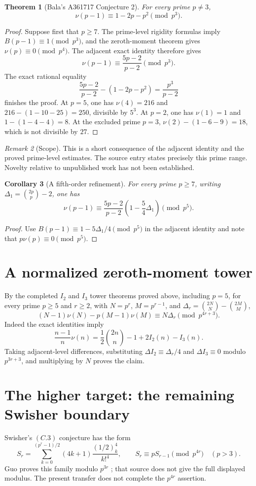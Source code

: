 \documentclass[11pt]{amsart}
\newtheorem{theorem}{Theorem}[section]
\newtheorem{corollary}[theorem]{Corollary}
\theoremstyle{definition}
\theoremstyle{remark}
\newtheorem{remark}[theorem]{Remark}
\begin{document}
\begin{theorem}[Bala's A361717 Conjecture 2]
For every prime $p\ne3$,
\[
 \nu(p-1)\equiv1-2p-p^2\pmod{p^3}.
\]
\end{theorem}
\begin{proof}
Suppose first that $p\geq7$. The prime-level rigidity formulas imply
$B(p-1)\equiv1\pmod{p^3}$, and the zeroth-moment theorem gives
$\nu(p)\equiv0\pmod{p^4}$. The adjacent exact identity therefore gives
\[
 \nu(p-1)\equiv\frac{5p-2}{p-2}\pmod{p^3}.
\]
The exact rational equality
\[
 \frac{5p-2}{p-2}-(1-2p-p^2)=\frac{p^3}{p-2}
\]
finishes the proof. At $p=5$, one has $\nu(4)=216$ and
$216-(1-10-25)=250$, divisible by $5^3$. At $p=2$, one has
$\nu(1)=1$ and $1-(1-4-4)=8$. At the excluded prime $p=3$,
$\nu(2)-(1-6-9)=18$, which is not divisible by $27$.
\end{proof}

\begin{remark}[Scope]
This is a short consequence of the adjacent identity and the proved
prime-level estimates. The source entry states precisely this prime range.
Novelty relative to unpublished work has not been established.
\end{remark}

\begin{corollary}[A fifth-order refinement]
For every prime $p\geq7$, writing
$\Delta_1=\binom{2p}{p}-2$, one has
\[
 \nu(p-1)\equiv\frac{5p-2}{p-2}
       \left(1-\frac54\Delta_1\right)\pmod{p^5}.
\]
\end{corollary}
\begin{proof}
Use $B(p-1)\equiv1-5\Delta_1/4\pmod{p^5}$ in the adjacent
identity and note that $p\nu(p)\equiv0\pmod{p^5}$.
\end{proof}

\section{A normalized zeroth-moment tower}
By the completed $I_2$ and $I_3$ tower theorems proved above, including $p=5$, for every prime $p\geq5$ and $r\geq2$, with
$N=p^r$, $M=p^{r-1}$, and
$\Delta_r=\binom{2N}{N}-\binom{2M}{M}$,
\[
 (N-1)\nu(N)-p(M-1)\nu(M)
       \equiv N\Delta_r\pmod{p^{4r+3}}.
\]
Indeed the exact identities imply
\[
 \frac{n-1}{n}\nu(n)=\frac12\binom{2n}{n}-1+2I_2(n)-I_3(n).
\]
Taking adjacent-level differences, substituting
$\Delta I_2\equiv\Delta_r/4$ and $\Delta I_3\equiv0$
modulo $p^{3r+3}$, and multiplying by $N$ proves the claim.

\section{The higher target: the remaining Swisher boundary}
Swisher's $(C.3)$ conjecture has the form
\[
S_r=\sum_{k=0}^{(p^r-1)/2}(4k+1)\frac{(1/2)_k^4}{k!^4},\qquad
S_r\equiv pS_{r-1}\pmod{p^{4r}}\quad(p>3).
\]
Guo proves this family modulo $p^{3r}$ \cite{Guo}; that source does not
give the full displayed modulus. The present transfer does not complete
the $p^{4r}$ assertion.
\end{document}
